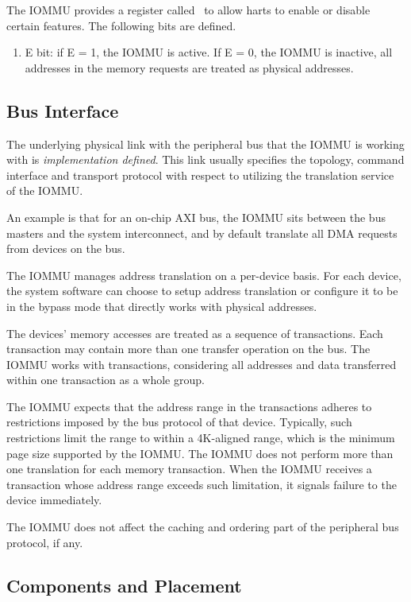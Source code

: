 The IOMMU provides a register called \iommucapen\ to allow harts to enable or disable
certain features. The following bits are defined.

\begin{enumerate}
    \item E bit: if E = 1, the IOMMU is active. If E = 0, the IOMMU is inactive, all
        addresses in the memory requests are treated as physical addresses.
\end{enumerate}

\subsection{Bus Interface}

The underlying physical link with the peripheral bus that the IOMMU is working with is
\textit{implementation defined}. This link usually specifies the topology, command
interface and transport protocol with respect to utilizing the translation service of
the IOMMU.

An example is that for an on-chip AXI bus, the IOMMU sits between the bus masters and the
system interconnect, and by default translate all DMA requests from devices on the bus.

The IOMMU manages address translation on a per-device basis. For each device, the system
software can choose to setup address translation or configure it to be in the bypass mode
that directly works with physical addresses. 

The devices' memory accesses are treated as a sequence of transactions. Each transaction
may contain more than one transfer operation on the bus. The IOMMU works with
transactions, considering all addresses and data transferred within one transaction as a
whole group.

The IOMMU expects that the address range in the transactions adheres to restrictions
imposed by the bus protocol of that device. Typically, such restrictions limit the range
to within a 4K-aligned range, which is the minimum page size supported by the IOMMU. The
IOMMU does not perform more than one translation for each memory transaction. When the
IOMMU receives a transaction whose address range exceeds such limitation, it signals
failure to the device immediately.

The IOMMU does not affect the caching and ordering part of the peripheral bus protocol, if
any.

\subsection{Components and Placement}

